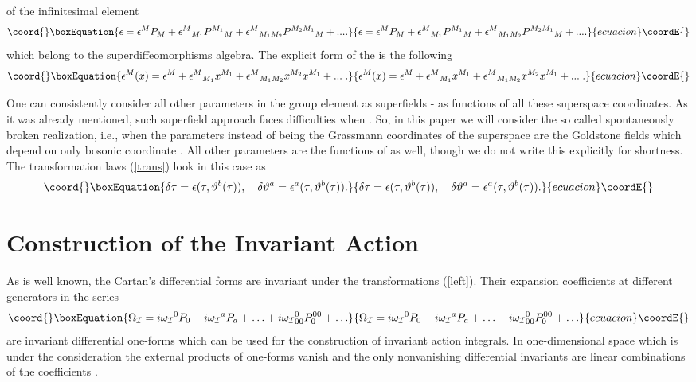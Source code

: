 \documentclass[a4paper,twocolumn,showpacs,preprintnumbers,amsmath,amssymb]{revtex4}
\providecommand{\p}[1]{(\ref{#1})}
\begin{document}
of the infinitesimal  element
\begin{equation}\coord{}\boxEquation{
\epsilon =\epsilon^M P_M+{\epsilon^{M}}_{M_1}{P^{M_1}}_M+
{\epsilon^{M}}_{M_1M_2}{P^{M_2M_1}}_M+... .
}{
\epsilon =\epsilon^M P_M+{\epsilon^{M}}_{M_1}{P^{M_1}}_M+
{\epsilon^{M}}_{M_1M_2}{P^{M_2M_1}}_M+... .
}{ecuacion}\coordE{}\end{equation}
 which belong to the
superdiffeomorphisms algebra. The explicit form of the \coordHE{}
is the following
\begin{equation}\coord{}\boxEquation{
\epsilon^M(x)=\epsilon^M+{\epsilon^M}_{M_1}x^{M_1}+
{\epsilon^M}_{M_1M_2}x^{M_2}x^{M_1}+...\;.
}{
\epsilon^M(x)=\epsilon^M+{\epsilon^M}_{M_1}x^{M_1}+
{\epsilon^M}_{M_1M_2}x^{M_2}x^{M_1}+...\;.
}{ecuacion}\coordE{}\end{equation}

One can consistently consider all other parameters in the group element
as superfields -
 as functions of all
these superspace coordinates. As it was already mentioned, such superfield
approach
faces  difficulties when \coordHE{}.  So, in this paper
we will consider the so called spontaneously broken
realization, i.e., when the parameters \coordHE{} instead of being
the Grassmann coordinates
of the superspace are the Goldstone fields
\coordHE{} which depend on  only bosonic coordinate
\myHighlight{$\tau$}\coordHE{}. All other parameters are the functions of \myHighlight{$\tau$}\coordHE{} as well,
though we do not write this explicitly for shortness. The transformation laws
\p{trans} look in this case as
\begin{equation}\coord{}\boxEquation{\label{trans1}
\delta \tau = \epsilon(\tau,\vartheta^b(\tau)),\quad
\delta \vartheta^a = \epsilon^a(\tau,\vartheta^b(\tau)).
}{\delta \tau = \epsilon(\tau,\vartheta^b(\tau)),\quad
\delta \vartheta^a = \epsilon^a(\tau,\vartheta^b(\tau)).
}{ecuacion}\coordE{}\end{equation}
\section{Construction of the Invariant Action}
As is well known, the Cartan's differential forms \coordHE{} are invariant under the transformations
(\ref{left}). Their expansion coefficients at different generators
in the series
\begin{equation}\coord{}\boxEquation{\label{Omega}
\Omega_{\cal I}=i{\omega_{\cal I}}^0 P_0+i{\omega_{\cal I}}^a P_a+\ldots+
i{\omega_{\cal I}}^0_{00} P^{00}_0+\ldots
}{\Omega_{\cal I}=i{\omega_{\cal I}}^0 P_0+i{\omega_{\cal I}}^a P_a+\ldots+
i{\omega_{\cal I}}^0_{00} P^{00}_0+\ldots
}{ecuacion}\coordE{}\end{equation}
are invariant differential one-forms which can be used
for the construction of invariant action integrals.
In one-dimensional space which is under the consideration
the external products of one-forms vanish and
the only nonvanishing differential invariants are linear
combinations of the coefficients \coordHE{}.
\end{document}
